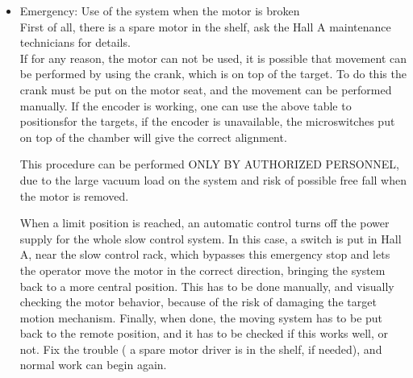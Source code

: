 {\begin{itemize}
\item Emergency: Use of the system when the motor is broken \\
First of all, there is a spare motor in the shelf, ask the Hall A
maintenance technicians for details. \\
If for any reason, the motor can not be used, it is possible that
movement can be performed by using the crank, which is on top of the
target. To do this the crank must be put on the motor seat, and the
movement can be performed manually. If the encoder is working, one
can use the above table to positionsfor the targets, if the encoder
is unavailable, the microswitches put on top of the chamber will give
the correct alignment. \\
\begin{safetyen}{10}{10}
This procedure can be performed ONLY BY AUTHORIZED PERSONNEL, due
to the large vacuum load on the system and risk of possible free fall
when the motor is removed.
\end{safetyen}
When a limit position is reached, an automatic control turns off the
power supply for the whole slow control system. In this case, a switch
is put in Hall A, near the slow control rack, which bypasses this
emergency stop and lets the operator move the motor in the correct
direction, bringing the system back to a more central position. This
has to be done manually, and visually checking the motor behavior,
because of the risk of damaging the target motion mechanism. Finally,
when done, the moving system has to be put back to the remote position,
and it has to be checked if this works well, or not. Fix the trouble
( a spare motor driver is in the shelf, if needed), and normal work
can begin again.
\end{itemize}

} %

